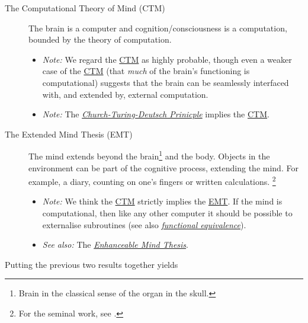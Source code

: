 \documentclass[logo,bsc,singlespacing,parskip]{infthesis}
\begin{document}
{ %
\begin{mdframed}
\begin{description}
\item[{The Computational Theory of Mind\label{computational theory of mind} (\label{org204d6ba}CTM)}] The brain is a computer and cognition/consciousness is a computation, bounded by the theory of computation.
\begin{itemize}
\item \emph{Note:} We regard the \hyperref[org204d6ba]{CTM} as highly probable, though even a weaker case of the \hyperref[org204d6ba]{CTM} (that \emph{much} of the brain's functioning is computational) suggests that the brain can be seamlessly interfaced with, and extended by, external computation.
\item \emph{Note:} The \emph{\hyperref[org78bb90f]{Church-Turing-Deutsch Prinicple}}  implies the \hyperref[org204d6ba]{CTM}.
\end{itemize}
\end{description}
\end{mdframed}

\begin{mdframed}
\begin{description}
\item[{The Extended Mind Thesis\label{extended mind thesis} (\label{org3b15c2d}EMT)}] The mind extends beyond the brain\footnote{Brain in the classical sense of the organ in the skull.} and the body.
Objects in the environment can be part of the cognitive process, extending the mind.
For example, a diary, counting on one's fingers or written calculations. \footnote{For the seminal work, see \autocite{ExtendedMindAndy}.}
\begin{itemize}
\item \emph{Note:} We think the \hyperref[org204d6ba]{CTM} strictly implies the \hyperref[org3b15c2d]{EMT}. If the mind is computational, then like any other computer it should be possible to externalise subroutines (see also \emph{\hyperref[org1ce07fc]{functional equivalence}}).
\item \emph{See also:} The \emph{\hyperref[org33f9226]{Enhanceable Mind Thesis}}.
\end{itemize}
\end{description}
\end{mdframed}

Putting the previous two results together yields

}
\end{document}
